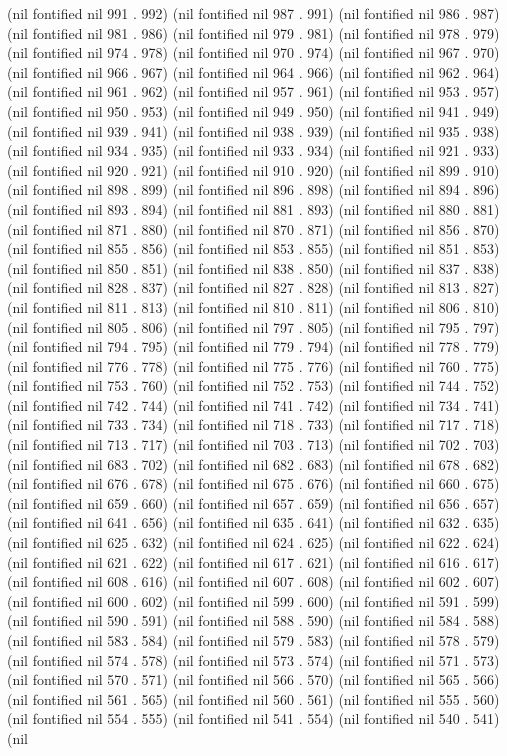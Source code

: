 (nil fontified nil 991 . 992) (nil fontified nil 987 . 991) (nil fontified nil 986 . 987) (nil fontified nil 981 . 986) (nil fontified nil 979 . 981) (nil fontified nil 978 . 979) (nil fontified nil 974 . 978) (nil fontified nil 970 . 974) (nil fontified nil 967 . 970) (nil fontified nil 966 . 967) (nil fontified nil 964 . 966) (nil fontified nil 962 . 964) (nil fontified nil 961 . 962) (nil fontified nil 957 . 961) (nil fontified nil 953 . 957) (nil fontified nil 950 . 953) (nil fontified nil 949 . 950) (nil fontified nil 941 . 949) (nil fontified nil 939 . 941) (nil fontified nil 938 . 939) (nil fontified nil 935 . 938) (nil fontified nil 934 . 935) (nil fontified nil 933 . 934) (nil fontified nil 921 . 933) (nil fontified nil 920 . 921) (nil fontified nil 910 . 920) (nil fontified nil 899 . 910) (nil fontified nil 898 . 899) (nil fontified nil 896 . 898) (nil fontified nil 894 . 896) (nil fontified nil 893 . 894) (nil fontified nil 881 . 893) (nil fontified nil 880 . 881) (nil fontified nil 871 . 880) (nil fontified nil 870 . 871) (nil fontified nil 856 . 870) (nil fontified nil 855 . 856) (nil fontified nil 853 . 855) (nil fontified nil 851 . 853) (nil fontified nil 850 . 851) (nil fontified nil 838 . 850) (nil fontified nil 837 . 838) (nil fontified nil 828 . 837) (nil fontified nil 827 . 828) (nil fontified nil 813 . 827) (nil fontified nil 811 . 813) (nil fontified nil 810 . 811) (nil fontified nil 806 . 810) (nil fontified nil 805 . 806) (nil fontified nil 797 . 805) (nil fontified nil 795 . 797) (nil fontified nil 794 . 795) (nil fontified nil 779 . 794) (nil fontified nil 778 . 779) (nil fontified nil 776 . 778) (nil fontified nil 775 . 776) (nil fontified nil 760 . 775) (nil fontified nil 753 . 760) (nil fontified nil 752 . 753) (nil fontified nil 744 . 752) (nil fontified nil 742 . 744) (nil fontified nil 741 . 742) (nil fontified nil 734 . 741) (nil fontified nil 733 . 734) (nil fontified nil 718 . 733) (nil fontified nil 717 . 718) (nil fontified nil 713 . 717) (nil fontified nil 703 . 713) (nil fontified nil 702 . 703) (nil fontified nil 683 . 702) (nil fontified nil 682 . 683) (nil fontified nil 678 . 682) (nil fontified nil 676 . 678) (nil fontified nil 675 . 676) (nil fontified nil 660 . 675) (nil fontified nil 659 . 660) (nil fontified nil 657 . 659) (nil fontified nil 656 . 657) (nil fontified nil 641 . 656) (nil fontified nil 635 . 641) (nil fontified nil 632 . 635) (nil fontified nil 625 . 632) (nil fontified nil 624 . 625) (nil fontified nil 622 . 624) (nil fontified nil 621 . 622) (nil fontified nil 617 . 621) (nil fontified nil 616 . 617) (nil fontified nil 608 . 616) (nil fontified nil 607 . 608) (nil fontified nil 602 . 607) (nil fontified nil 600 . 602) (nil fontified nil 599 . 600) (nil fontified nil 591 . 599) (nil fontified nil 590 . 591) (nil fontified nil 588 . 590) (nil fontified nil 584 . 588) (nil fontified nil 583 . 584) (nil fontified nil 579 . 583) (nil fontified nil 578 . 579) (nil fontified nil 574 . 578) (nil fontified nil 573 . 574) (nil fontified nil 571 . 573) (nil fontified nil 570 . 571) (nil fontified nil 566 . 570) (nil fontified nil 565 . 566) (nil fontified nil 561 . 565) (nil fontified nil 560 . 561) (nil fontified nil 555 . 560) (nil fontified nil 554 . 555) (nil fontified nil 541 . 554) (nil fontified nil 540 . 541) (nil 
